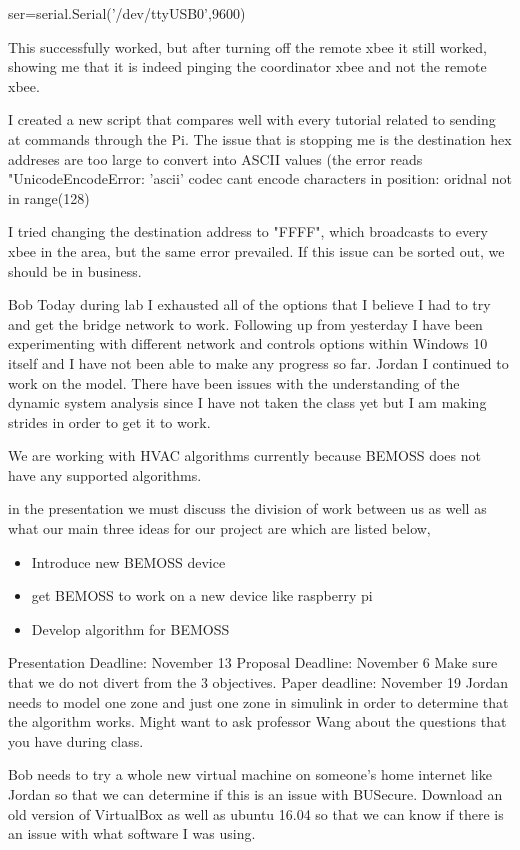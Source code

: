 \documentclass[fontsize=11pt, %
                             paper=letter, %
                             twoside, %
                             captions=tableheading,
                             index=totoc,
                             hyperref]{labbook}
\begin{document}
ser=serial.Serial('/dev/ttyUSB0',9600)

This successfully worked, but after turning off the remote xbee it still worked, showing me that it is indeed pinging the coordinator xbee and not the remote xbee. 

I created a new script that compares well with every tutorial related to sending at commands through the Pi. The issue that is stopping me is the destination hex addreses are too large to convert into ASCII values (the error reads 
"UnicodeEncodeError: 'ascii' codec cant encode characters in position: oridnal not in range(128) 

I tried changing the destination address to "FFFF", which broadcasts to every xbee in the area, but the same error prevailed. If this issue can be sorted out, we should be in business. 

Bob
Today during lab I exhausted all of the options that I believe I had to try and get the bridge network to work. Following up from yesterday I have been experimenting with different network and controls options within Windows 10 itself and I have not been able to make any progress so far. 
Jordan
I continued to work on the model. There have been issues with the understanding of the dynamic system analysis since I have not taken the class yet but I am making strides in order to get it to work.

We are working with HVAC algorithms currently because BEMOSS does not have any supported algorithms.

in the presentation we must discuss the division of work between us as well as what our main three ideas for our project are which are listed below,
\begin{itemize}
    \item Introduce new BEMOSS device
    \item get BEMOSS to work on a new device like raspberry pi
    \item Develop algorithm for BEMOSS
\end{itemize}
Presentation Deadline: November 13
Proposal Deadline: November 6
Make sure that we do not divert from the 3 objectives.
Paper deadline: November 19
Jordan needs to model one zone and just one zone in simulink in order to determine that the algorithm works. Might want to ask professor Wang about the questions that you have during class.

Bob needs to try a whole new virtual machine on someone's home internet like Jordan so that we can determine if this is an issue with BUSecure. Download an old version of VirtualBox as well as ubuntu 16.04 so that we can know if there is an issue with what software I was using.
\end{document}
